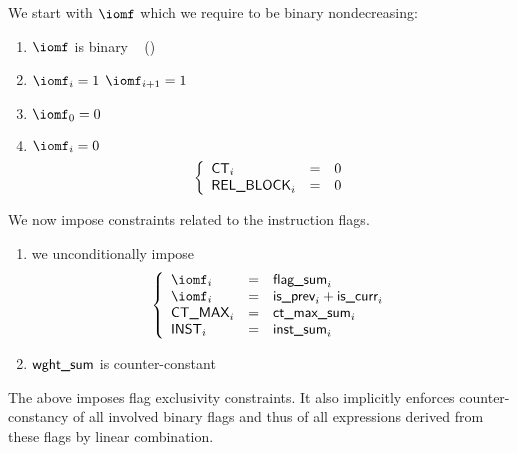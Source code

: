 We start with $\iomf$ which we require to be binary nondecreasing:
\begin{enumerate}
	\item $\iomf$ is binary ~ (\trash)
	\item \If $\iomf _{i} = 1$ \Then $\iomf _{i + 1} = 1$
	\item $\iomf _{0} = 0$
	\item \If $\iomf _{i} = 0$ \Then
		\[
			\left\{ \begin{array}{lcl}
				\textsf{CT}       _{i} & = & 0 \\
				\textsf{REL\_BLOCK} _{i} & = & 0 \\
			\end{array} \right.
		\]
\end{enumerate}
We now impose constraints related to the instruction flags.
\begin{enumerate}[resume]
	\item we unconditionally impose
		\[
			\left\{ \begin{array}{lcl}
				\iomf        _{i} & = & \locFlagSum  _{i}                         \\
				\iomf        _{i} & = & \locIsPrevConf _{i} + \locIsCurrConf _{i} \\
				\maxCt       _{i} & = & \locMaxCtSum _{i}                         \\
				\instruction _{i} & = & \locInstSum  _{i}                         \\
			\end{array} \right.
		\]
	\item $\textsf{wght\_sum}$ is counter-constant
\end{enumerate}
\saNote{}
The above imposes flag exclusivity constraints.
It also implicitly enforces counter-constancy of all involved binary flags and thus of all expressions derived from these flags by linear combination.
